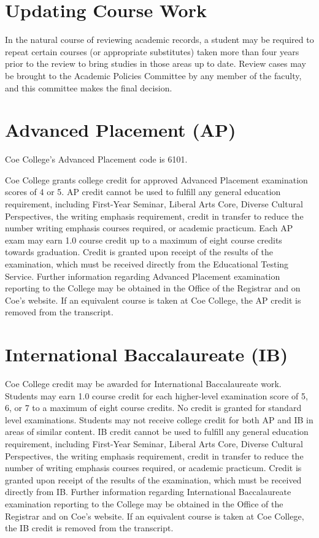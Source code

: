 \documentclass[
  letterpaper,
]{scrbook}
\begin{document}
\hypertarget{updating-course-work}{%
\section{Updating Course Work}\label{updating-course-work}}

In the natural course of reviewing academic records, a student may be
required to repeat certain courses (or appropriate substitutes) taken
more than four years prior to the review to bring studies in those areas
up to date. Review cases may be brought to the Academic Policies
Committee by any member of the faculty, and this committee makes the
final decision.

\hypertarget{advanced-placement-ap}{%
\section{Advanced Placement (AP)}\label{advanced-placement-ap}}

Coe College's Advanced Placement code is 6101.

Coe College grants college credit for approved Advanced Placement
examination scores of 4 or 5. AP credit cannot be used to fulfill any
general education requirement, including First-Year Seminar, Liberal
Arts Core, Diverse Cultural Perspectives, the writing emphasis
requirement, credit in transfer to reduce the number writing emphasis
courses required, or academic practicum. Each AP exam may earn 1.0
course credit up to a maximum of eight course credits towards
graduation. Credit is granted upon receipt of the results of the
examination, which must be received directly from the Educational
Testing Service. Further information regarding Advanced Placement
examination reporting to the College may be obtained in the Office of
the Registrar and on Coe's website. If an equivalent course is taken at
Coe College, the AP credit is removed from the transcript.

\hypertarget{international-baccalaureate-ib}{%
\section{International Baccalaureate
(IB)}\label{international-baccalaureate-ib}}

Coe College credit may be awarded for International Baccalaureate work.
Students may earn 1.0 course credit for each higher-level examination
score of 5, 6, or 7 to a maximum of eight course credits. No credit is
granted for standard level examinations. Students may not receive
college credit for both AP and IB in areas of similar content. IB credit
cannot be used to fulfill any general education requirement, including
First-Year Seminar, Liberal Arts Core, Diverse Cultural Perspectives,
the writing emphasis requirement, credit in transfer to reduce the
number of writing emphasis courses required, or academic practicum.
Credit is granted upon receipt of the results of the examination, which
must be received directly from IB. Further information regarding
International Baccalaureate examination reporting to the College may be
obtained in the Office of the Registrar and on Coe's website. If an
equivalent course is taken at Coe College, the IB credit is removed from
the transcript.
\end{document}
